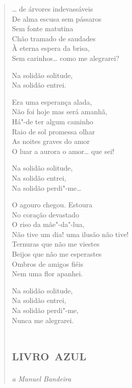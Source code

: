 

\begin{verse}
\ldots{} de árvores indevassáveis\\
De alma escusa sem pássaros\\
Sem fonte matutina\\
Chão tramado de saudades\\
À eterna espera da brisa,\\
Sem carinhos\ldots{} como me alegrarei?

Na solidão solitude,\\
Na solidão entrei.

Era uma esperança alada,\\
Não foi hoje mas será amanhã,\\
Há"-de ter algum caminho\\
Raio de sol promessa olhar\\
As noites graves do amor\\
O luar a aurora o amor\ldots{} que sei!

Na solidão solitude,\\
Na solidão entrei,\\
Na solidão perdi"-me\ldots{}

O agouro chegou. Estoura\\
No coração devastado\\
O riso da mãe"-da"-lua,\\
Não tive um dia! uma ilusão não tive!\\
Ternuras que não me viestes\\
Beijos que não me esperastes\\
Ombros de amigos fiéis\\
Nem uma flor apanhei.

Na solidão solitude,\\
Na solidão entrei,\\
Na solidão perdi"-me,\\
Nunca me alegrarei.

\part{\textsc{livro azul}}


\begin{flushright}
\emph{a Manuel Bandeira}
\end{flushright}


\end{verse}
